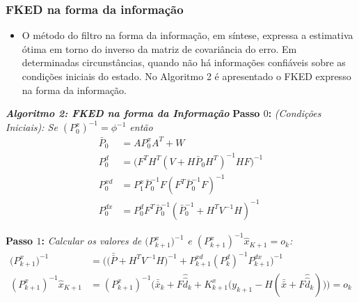 \begin{frame}
	\frametitle{FKED na forma da informação}
	\begin{itemize}
		\item O método do filtro na forma da informação, em síntese, expressa a estimativa ótima em torno do inverso da matriz de covariância do erro. Em determinadas circunstâncias, quando não há informações confiáveis sobre as condições iniciais do estado. No Algoritmo 2 é apresentado o FKED expresso na forma da informação.
	\end{itemize}
\end{frame}

\begin{frame}
	\hline
		\small	\emph{\textbf{Algoritmo 2: FKED na forma da Informação}}
	\hline
	\vspace{0.1cm}
	\small \textbf{Passo $0$:} \textit{(Condições Iniciais): Se $(P^{x}_{0})^{-1} =  \phi^{-1}$ então}
	\small
	\begin{align}
		\bar{P}_{0} &= AP^{x}_{0}A^{T} + W \nonumber \\
		P^{d}_{0} &= \big(F^{T} H^{T} (V + H\bar{P}_{0} H^{T})^{-1} HF\big)^{-1} \nonumber \\
		P^{xd}_{0} &= P^{x}_{1} \bar{P}^{-1}_{0} F (F^{T} \bar{P}^{-1}_{0} F)^{-1} \nonumber \\
		P^{dx}_{0} &= P^{d}_{0} F^{T} \bar{P}^{-1}_{0} (\bar{P}^{-1}_{0} + H^{T} V^{-1} H)^{-1} \nonumber
	\end{align}

	\small \textbf{Passo $1$:} \textit{Calcular os valores de $\big(P^{x}_{k+1}\big)^{-1}$ e $(P^{x}_{k+1})^{-1}\hat{x}_{K+1} = o_{k}$:}
	\small{
	\begin{align}
		\big(P^{x}_{k+1}\big)^{-1} &=\bigg(\bigg(\bar{\bar{P}} + H^{T} V^{-1} H \bigg)^{-1} + P^{xd}_{k+1} (P^{d}_{k})^{-1} P^{dx}_{k+1} \bigg)^{-1}\\
		(P^{x}_{k+1})^{-1}\hat{x}_{K+1} &= (P^{x}_{k+1})^{-1}\big( \bar{\bar{x}}_{k} + F\hat{\hat{d}}_{k} + K^{x}_{k+1} \big( y_{k+1} - H ( \bar{\bar{x}} + F \hat{\hat{d}}_{k} ) \big) \big) = o_{k}
	\end{align}}
	\hline
\end{frame}


